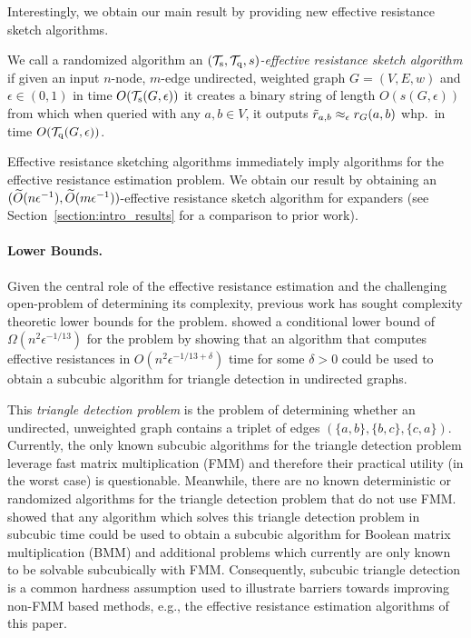 Interestingly, we obtain our main result by providing new effective resistance sketch algorithms.

\begin{definition}
\label{def:eff_res_sketch}

We call a randomized algorithm an \emph{$(\mathcal{T}_{\mathrm{s}}, \mathcal{T}_{\mathrm{q}}, s)$-effective resistance sketch algorithm} if given an input $n$-node, $m$-edge  undirected, weighted graph $G = (V,E,w)$ and $\epsilon \in (0, 1)$ in time $O(\mathcal{T}_{\mathrm{s}}(G,\epsilon))$ it creates a binary string of length $O(s(G,\epsilon))$ from which when queried with any $a,b\in V$, it outputs $\tilde{r}_{a,b} \approx_\epsilon {r}_{G}(a,b)$ whp.\ in time $O(\mathcal{T}_{\mathrm{q}}(G,\epsilon))$. 
\end{definition}

Effective resistance sketching algorithms immediately imply algorithms for the effective resistance estimation problem. We obtain our result by obtaining an $(\widetilde{O}( {n \epsilon^{-1}} ), \widetilde{O}( {m\epsilon^{-1}} ))$-effective resistance sketch algorithm for expanders (see Section~\ref{section:intro_results} for a comparison to prior work). 

\paragraph{Lower Bounds.} Given the central role of the effective resistance estimation and the challenging open-problem of determining its complexity, previous work has sought complexity theoretic lower bounds for the problem. \cite{musco2017spectrum} showed a conditional lower bound of $\Omega(n^2\epsilon^{-1/13})$ for the problem by showing that an algorithm that computes effective resistances in $O(n^2\epsilon^{-1/13 + \delta})$ time for some $\delta > 0$ could be used to obtain a subcubic algorithm for triangle detection in undirected graphs.

This \emph{triangle detection problem} is the problem of determining whether an undirected, unweighted graph contains a triplet of edges $(\{a, b\}, \{b, c\}, \{c, a\})$. Currently, the only known subcubic algorithms for the triangle detection problem leverage fast matrix multiplication (FMM) and therefore their practical utility (in the worst case) is questionable. Meanwhile, there are no known deterministic or randomized algorithms for the triangle detection problem that do not use FMM. \cite{william_williams2018} showed that any algorithm which solves this triangle detection problem in subcubic time could be used to obtain a subcubic algorithm for Boolean matrix multiplication (BMM) and additional problems which currently are only known to be solvable subcubically with FMM. 
Consequently, subcubic triangle detection is a common hardness assumption used to illustrate barriers towards improving non-FMM based methods, e.g., the effective resistance estimation algorithms of this paper.
 
